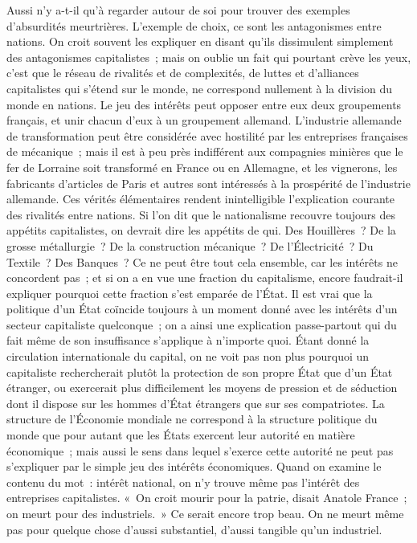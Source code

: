 \documentclass[french,twoside]{book} %
\begin{document}
Aussi n'y a-t-il qu'à regarder autour de soi pour trouver des exemples d'absurdités meurtrières. L'exemple de choix, ce sont les antagonismes entre nations. On croit souvent les expliquer en disant qu'ils dissimulent simplement des antagonismes capitalistes ; mais on oublie un fait qui pourtant crève les yeux, c'est que le réseau de rivalités et de complexités, de luttes et d'alliances capitalistes qui s'étend sur le monde, ne correspond nullement à la division du monde en nations. Le jeu des intérêts peut opposer entre eux deux groupe­ments français, et unir chacun d'eux à un groupement allemand. L'industrie allemande de transformation peut être considérée avec hostilité par les entreprises françaises de mécanique ; mais il est à peu près indifférent aux compagnies minières que le fer de Lorraine soit transformé en France ou en Allemagne, et les vignerons, les fabricants d'articles de Paris et autres sont intéressés à la prospérité de l'industrie allemande. Ces vérités élémentaires rendent inintelligible l'explication courante des rivalités entre nations. Si l'on dit que le nationalisme recouvre toujours des appétits capitalistes, on devrait dire les appétits de qui. Des Houillères ? De la grosse métallurgie ? De la construction mécanique ? De l'Électricité ? Du Textile ? Des Banques ? Ce ne peut être tout cela ensemble, car les intérêts ne concordent pas ; et si on a en vue une fraction du capitalisme, encore faudrait-il expliquer pourquoi cette fraction s'est emparée de l'État. Il est vrai que la politique d'un État coïncide toujours à un moment donné avec les intérêts d'un secteur capitaliste quelconque ; on a ainsi une explication passe-partout qui du fait même de son insuffisance s'applique à n'importe quoi. Étant donné la circulation interna­tionale du capital, on ne voit pas non plus pourquoi un capitaliste recher­cherait plutôt la protection de son propre État que d'un État étranger, ou exercerait plus difficilement les moyens de pression et de séduction dont il dispose sur les hommes d'État étrangers que sur ses compatriotes. La structure de l'Économie mondiale ne correspond à la structure politique du monde que pour autant que les États exercent leur autorité en matière économique ; mais aussi le sens dans lequel s'exerce cette autorité ne peut pas s'expliquer par le simple jeu des intérêts économiques. Quand on examine le contenu du mot : intérêt national, on n'y trouve même pas l'intérêt des entreprises capitalistes. « On croit mourir pour la patrie, disait Anatole France ; on meurt pour des industriels. » Ce serait encore trop beau. On ne meurt même pas pour quelque chose d'aussi substantiel, d'aussi tangible qu'un industriel.\par
\end{document}
